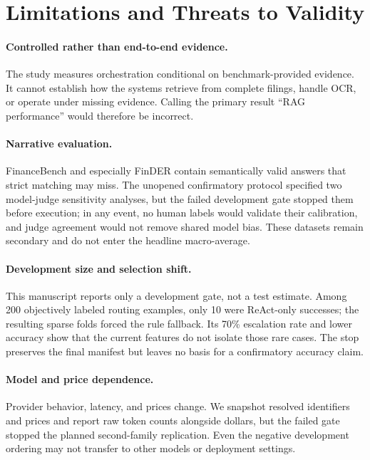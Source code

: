 \section{Limitations and Threats to Validity}

\paragraph{Controlled rather than end-to-end evidence.}
The study measures orchestration conditional on benchmark-provided evidence. It cannot establish how the systems retrieve from complete filings, handle OCR, or operate under missing evidence. Calling the primary result ``RAG performance'' would therefore be incorrect.

\paragraph{Narrative evaluation.}
FinanceBench and especially FinDER contain semantically valid answers that strict matching may miss. The unopened confirmatory protocol specified two model-judge sensitivity analyses, but the failed development gate stopped them before execution; in any event, no human labels would validate their calibration, and judge agreement would not remove shared model bias. These datasets remain secondary and do not enter the headline macro-average.

\paragraph{Development size and selection shift.}
This manuscript reports only a development gate, not a test estimate. Among 200 objectively labeled routing examples, only 10 were ReAct-only successes; the resulting sparse folds forced the rule fallback. Its 70\% escalation rate and lower accuracy show that the current features do not isolate those rare cases. The stop preserves the final manifest but leaves no basis for a confirmatory accuracy claim.

\paragraph{Model and price dependence.}
Provider behavior, latency, and prices change. We snapshot resolved identifiers and prices and report raw token counts alongside dollars, but the failed gate stopped the planned second-family replication. Even the negative development ordering may not transfer to other models or deployment settings.

